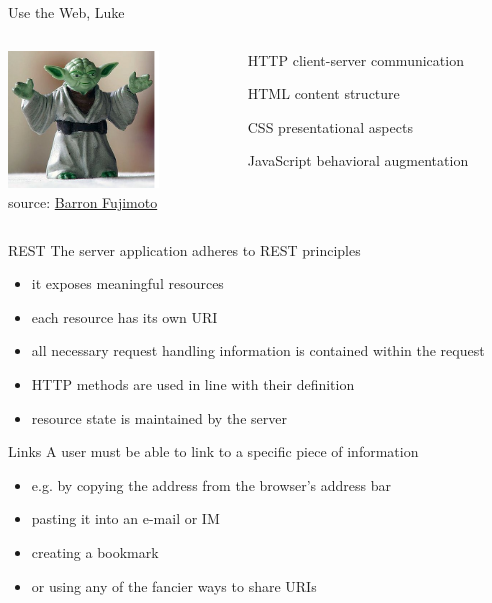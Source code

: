 \documentclass{beamer}
\begin{document}
\begin{frame}{Use the Web, Luke}
  \begin{columns}
    \begin{column}{4.0cm}
      \includegraphics[width=4cm]{images/yoda.png}
      \\
      \tiny source: \href{http://www.flickr.com/photos/barron/15483113/}{Barron Fujimoto}
    \end{column}

    \begin{column}{5.5cm}
      \begin{itemize}
        \item[HTTP] client-server communication
        \item[HTML] content structure
        \item[CSS] presentational aspects
        \item[JavaScript] behavioral augmentation
      \end{itemize}
    \end{column}
  \end{columns}
\end{frame}

\begin{frame}{REST}
  The server application adheres to REST principles

  \begin{itemize}
    \item it exposes meaningful resources
    \item each resource has its own URI
    \item all necessary request handling information is contained within the request
    \item HTTP methods are used in line with their definition
    \item resource state is maintained by the server
  \end{itemize}
\end{frame}

\begin{frame}{Links}
  A user must be able to link to a specific piece of information

  \begin{itemize}
    \item e.g. by copying the address from the browser's address bar
    \item pasting it into an e-mail or IM
    \item creating a bookmark
    \item or using any of the fancier ways to share URIs
  \end{itemize}
\end{frame}
\end{document}
